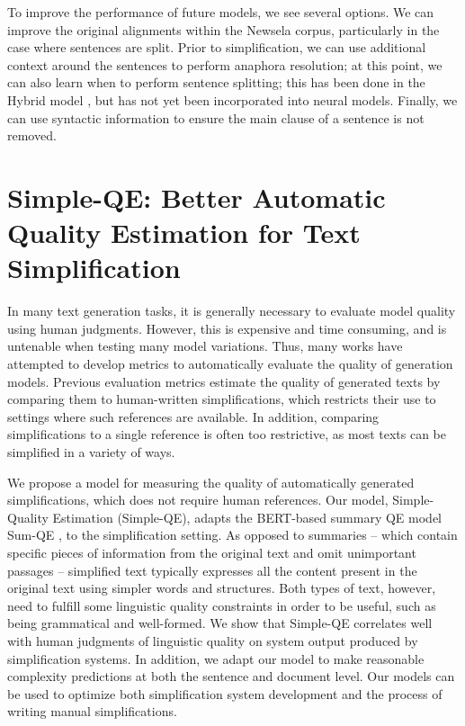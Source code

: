 \documentclass[thesis.tex]{subfiles}
\begin{document}
To improve the performance of future models, we see several options. We can improve the original alignments within the Newsela corpus, particularly in the case where sentences are split. Prior to simplification, we can use additional context around the sentences to perform anaphora resolution; at this point, we can also learn when to perform sentence splitting; this has been done in the Hybrid model \citep{narayan2014hybrid}, but has not yet been incorporated into neural models. Finally, we can use syntactic information to ensure the main clause of a sentence is not removed.

\section{Simple-QE: Better Automatic Quality Estimation for Text Simplification} \label{sec:simpleqe}

In many text generation tasks, it is generally necessary to evaluate model quality using human judgments. However, this is expensive and time consuming, and is untenable when testing many model variations. Thus, many works have attempted to develop metrics to automatically evaluate the quality of generation models. Previous evaluation metrics \citep{papineni2002bleu,xu2016optimizing} estimate the quality of generated texts by comparing them to human-written simplifications, which restricts their use to settings where such references are available. In addition, comparing simplifications to a single reference is often too restrictive, as most texts can be simplified in a variety of ways.

We propose a model for measuring the quality of automatically generated simplifications, which does not require human references. Our model, Simple-Quality Estimation (Simple-QE), adapts the BERT-based summary QE model Sum-QE \citep{xenouleas2019sumqe}, to the simplification setting. As opposed to summaries -- which contain specific pieces of information from the original text 
and omit unimportant passages -- simplified text typically expresses all the content present in the original text using simpler words and structures. Both types of text, however, need to fulfill some linguistic quality constraints in order to be useful, such as being  grammatical and well-formed. We show that Simple-QE correlates well with human judgments of linguistic quality on system output produced by simplification systems. In addition, we adapt our model to make reasonable complexity predictions at both the sentence and document level. Our models can be used to optimize both simplification system development and the process of writing manual simplifications.
\end{document}
